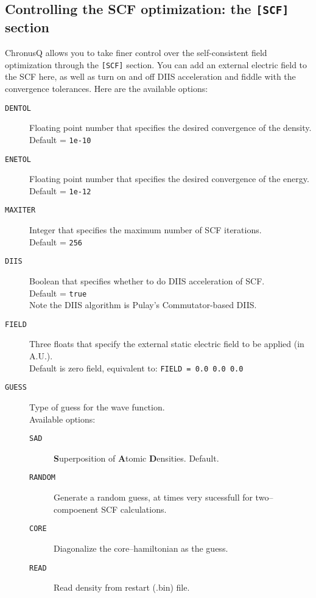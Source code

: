 \documentclass[12pt]{article}
\begin{document}
    \subsection{Controlling the SCF optimization: the \texttt{[SCF]} section} \label{subsec:SCFInput}
    ChronusQ allows you to take finer control over the self-consistent field optimization through the \texttt{[SCF]} section. You can add an external electric field to the SCF here, as well as turn on and off DIIS acceleration and fiddle with the convergence tolerances. Here are the available options:
     \begin{description}
       \item[\texttt{DENTOL}] Floating point number that specifies the desired convergence of the density. \\
        Default = \texttt{1e-10} 
       \item[\texttt{ENETOL}] Floating point number that specifies the desired convergence of the energy. \\
        Default = \texttt{1e-12}
       \item[\texttt{MAXITER}] Integer that specifies the maximum number of SCF iterations. \\
        Default = \texttt{256}
       \item[\texttt{DIIS}] Boolean that specifies whether to do DIIS acceleration of SCF. \\
        Default = \texttt{true} \\
        Note the DIIS algorithm is Pulay's Commutator-based DIIS.
       \item[\texttt{FIELD}] Three floats that specify the external static electric field to be applied (in A.U.). \\
       Default is zero field, equivalent to: \texttt{FIELD = 0.0 0.0 0.0}
       \item[\texttt{GUESS}] Type of guess for the wave function. \\
       Available options: 
         \begin{description}
           \item[\texttt{SAD}] \textbf{S}uperposition of \textbf{A}tomic \textbf{D}ensities. Default.
           \item[\texttt{RANDOM}] Generate a random guess, at times very sucessfull for two--compoenent SCF calculations. 
           \item[\texttt{CORE}] Diagonalize the core--hamiltonian as the guess.
           \item[\texttt{READ}] Read density from restart (.bin) file.
         \end{description}
         
     \end{description}
\end{document}
